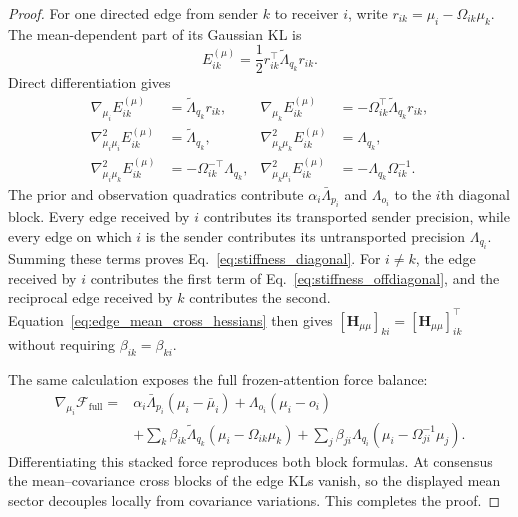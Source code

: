 \documentclass[12pt]{article}
\begin{document}
\begin{proof}
For one directed edge from sender $k$ to receiver $i$, write $r_{ik}=\mu_i-\Omega_{ik}\mu_k$. The mean-dependent part of its Gaussian KL is
\begin{equation}
E_{ik}^{(\mu)}=\frac12 r_{ik}^{\top}\widetilde\Lambda_{q_k}r_{ik}.
\label{eq:edge_mean_quadratic}
\end{equation}
Direct differentiation gives
\begin{align}
\nabla_{\mu_i}E_{ik}^{(\mu)}
&=\widetilde\Lambda_{q_k}r_{ik},
&
\nabla_{\mu_k}E_{ik}^{(\mu)}
&=-\Omega_{ik}^{\top}\widetilde\Lambda_{q_k}r_{ik},
\label{eq:edge_mean_gradients}\\
\nabla_{\mu_i\mu_i}^2E_{ik}^{(\mu)}
&=\widetilde\Lambda_{q_k},
&
\nabla_{\mu_k\mu_k}^2E_{ik}^{(\mu)}
&=\Lambda_{q_k},
\label{eq:edge_mean_diagonal_hessians}\\
\nabla_{\mu_i\mu_k}^2E_{ik}^{(\mu)}
&=-\Omega_{ik}^{-\top}\Lambda_{q_k},
&
\nabla_{\mu_k\mu_i}^2E_{ik}^{(\mu)}
&=-\Lambda_{q_k}\Omega_{ik}^{-1}.
\label{eq:edge_mean_cross_hessians}
\end{align}
The prior and observation quadratics contribute $\alpha_i\bar\Lambda_{p_i}$ and $\Lambda_{o_i}$ to the $i$th diagonal block. Every edge received by $i$ contributes its transported sender precision, while every edge on which $i$ is the sender contributes its untransported precision $\Lambda_{q_i}$. Summing these terms proves Eq.~\eqref{eq:stiffness_diagonal}. For $i\ne k$, the edge received by $i$ contributes the first term of Eq.~\eqref{eq:stiffness_offdiagonal}, and the reciprocal edge received by $k$ contributes the second. Equation~\eqref{eq:edge_mean_cross_hessians} then gives $[\mathbf H_{\mu\mu}]_{ki}=[\mathbf H_{\mu\mu}]_{ik}^{\top}$ without requiring $\beta_{ik}=\beta_{ki}$.

The same calculation exposes the full frozen-attention force balance:
\begin{align}
\nabla_{\mu_i}\mathcal F_{\mathrm{full}}
={}&\alpha_i\bar\Lambda_{p_i}(\mu_i-\bar\mu_i)
+\Lambda_{o_i}(\mu_i-o_i)\nonumber\\
&+\sum_k\beta_{ik}\widetilde\Lambda_{q_k}
(\mu_i-\Omega_{ik}\mu_k)
+\sum_j\beta_{ji}\Lambda_{q_i}
(\mu_i-\Omega_{ji}^{-1}\mu_j).
\label{eq:stiffness_force_balance}
\end{align}
Differentiating this stacked force reproduces both block formulas. At consensus the mean--covariance cross blocks of the edge KLs vanish, so the displayed mean sector decouples locally from covariance variations. This completes the proof.
\end{proof}
\end{document}

